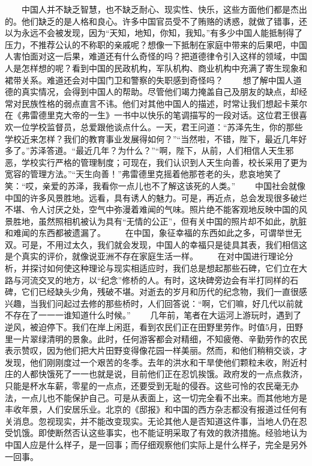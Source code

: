 \documentclass[12pt,oneside]{book}
\begin{document}
\begin{common-format}
　　中国人并不缺乏智慧，也不缺乏耐心、现实性、快乐，这些方面他们都是杰出的。他们缺乏的是人格和良心。许多中国官员受不了贿赂的诱惑，就做了错事，还以为永远不会被发现，因为“天知，地知，你知，我知。”有多少中国人能抵制得了压力，不推荐公认的不称职的亲戚呢？想像一下抵制在家庭中带来的后果吧，中国人害怕面对这一后果，难道还有什么奇怪的吗？把道德律令引入这样的领域，中国人是怎样想的呢？看到中国的民政机构，军队机构、商业机构中充满了寄生现象和裙带关系。难道还会对中国门卫和警察的失职感到奇怪吗？ 
　　想了解中国人道德的真实情况，会得到中国人的帮助。尽管他们竭力掩盖自己及朋友的缺点，却经常对民族性格的弱点直言不讳。他们对其他中国人的描述，时常让我们想起卡莱尔在《弗雷德里克大帝的一生》一书中以快乐的笔调描写的一段对话。这位君王很喜欢一位学校监督员，总爱跟他谈点什么。一天，君王问道：“苏泽先生，你的那些学校近来怎样？我们的教育事业发展得如何？”“当然啦，不错，陛下，最近几年好多了。”苏泽答道。“最近几年？为什么？”“啊，陛下，从前，人们相信人天生邪恶，学校实行严格的管理制度；可现在，我们认识到人天生向善，校长采用了更为宽容的管理方法。”“天生向善！”弗雷德里克摇着他那苍老的头，悲哀地笑了笑：“哎，亲爱的苏泽，我看你一点儿也不了解这该死的人类。” 
　　中国社会就像中国的许多风景胜地。远看，具有诱人的魅力。可是，再近点，总会发现很多破烂不堪、令人讨厌之处，空气中弥漫着难闻的气味。照片绝不能客观地反映中国的风景胜地，虽然照相机被认为具有“无情的公正”，但有关中国的照片却不如此，肮脏和难闻的东西都被遗漏了。 
　　在中国，象征幸福的东西如此之多，可谓举世无双。可是，不用过太久，我们就会发现，中国人的幸福只是徒具其表，我们相信这是个真实的评价，就像说亚洲不存在家庭生活一样。 
　　在对中国进行理论分析，并探讨如何使这种理论与现实相适应时，我们总是想起那些石碑，它们立在大路与河流交叉的地方，以“纪念”修桥的人。有时，这块碑旁边会有半打同样的石碑，它们已经缺头少角，残破不堪。对逝去的岁月和历代的纪念物，我们一直很感兴趣，当我们问起过去修的那些桥时，人们回答说：“啊，它们嘛，好几代以前就不存在了一一一谁知道什么时候。” 
　　几年前，笔者在大运河上游玩时，遇到了逆风，被迫停下。我们在岸上闲逛，看到农民们正在田野里劳作。时值5月，田野里一片翠绿清明的景象。此时，任何游客都会对精细，不知疲倦、辛勤劳作的农民表示赞叹，因为他们把大片田野变得像花园一样美丽。然而，和他们稍稍交谈，才发现，他们刚刚度过一个艰苦的冬季。去年的洪水和干旱使他们颗粒未收，附近村庄的人都快饿死了一一也就是说，目前他们正在忍饥挨饿。政府发的一点点救济，只能是杯水车薪，零星的一点点，还要受到无耻的侵吞。这些可怜的农民毫无办法，一点儿也不能保护自己。可是从表面上，这一切完全看不出来。而其他地方是丰收年景，人们安居乐业。北京的《邸报》和中国的西方杂志都没有报道过任何有关消息。忽视现实，并不能改变现实。无论其他人是否知道这件事，当地人仍在忍受饥饿。即使断然否认这些事实，也不能证明采取了有效的救济措施。经验地认为中国人应是什么样子，是一回事；而仔细观察他们实际上是什么样子，完全是另外一回事。 

\end{common-format}
\end{document}
